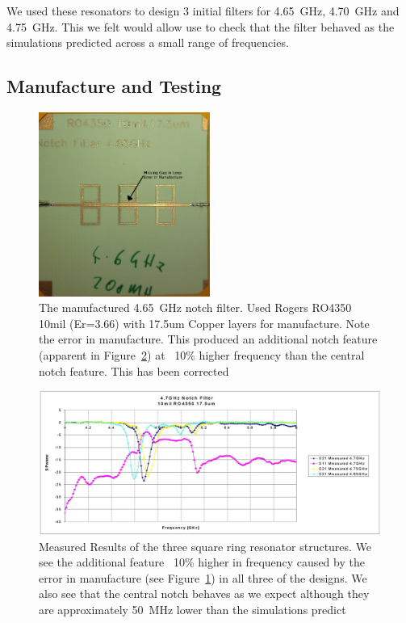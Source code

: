 We used these resonators to design 3 initial filters for 4.65~GHz, 4.70~GHz and 4.75~GHz. This we felt would allow use to check that the filter behaved as the simulations predicted across a small range of frequencies.
\clearpage
\subsection{Manufacture and Testing}

\begin{figure}
 \centering
 \includegraphics[width=0.5\textwidth]{./images/NotchFilter/IMAG0148.jpg}
 \caption{The manufactured 4.65~GHz notch filter. Used Rogers RO4350 10mil (Er=3.66) with 17.5um Copper layers for manufacture. Note the error in manufacture. This produced an additional notch feature (apparent in Figure~\ref{fig:MeasuredResults}) at ~10\% higher frequency than the central notch feature. This has been corrected}
 \label{fig:4_65GHzFilter}
\end{figure}


\begin{figure}
 \centering
 \includegraphics[width=\textwidth]{./images/NotchFilter/MeauredResults.JPG}
 \caption{Measured Results of the three square ring resonator structures. We see the additional feature ~10\% higher in frequency caused by the error in manufacture (see Figure~\ref{fig:4_65GHzFilter}) in all three of the designs. We also see that the central notch behaves as we expect although they are approximately 50~MHz lower than the simulations predict}
 \label{fig:MeasuredResults}
\end{figure}

